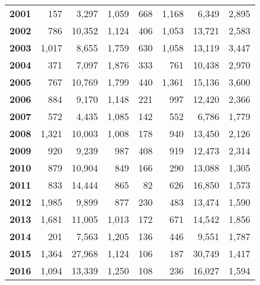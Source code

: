 \begin{table}[h]
{\begin{tabular}{@{}>{\bfseries}r r r r r r r r@{}}
2001 & 157 & 3,297 & 1,059 & 668 & 1,168 & 6,349 & 2,895 \\
2002 & 786 & 10,352 & 1,124 & 406 & 1,053 & 13,721 & 2,583 \\
2003 & 1,017 & 8,655 & 1,759 & 630 & 1,058 & 13,119 & 3,447 \\
2004 & 371 & 7,097 & 1,876 & 333 & 761 & 10,438 & 2,970 \\
2005 & 767 & 10,769 & 1,799 & 440 & 1,361 & 15,136 & 3,600 \\
2006 & 884 & 9,170 & 1,148 & 221 & 997 & 12,420 & 2,366 \\
2007 & 572 & 4,435 & 1,085 & 142 & 552 & 6,786 & 1,779 \\
2008 & 1,321 & 10,003 & 1,008 & 178 & 940 & 13,450 & 2,126 \\
2009 & 920 & 9,239 & 987 & 408 & 919 & 12,473 & 2,314 \\
2010 & 879 & 10,904 & 849 & 166 & 290 & 13,088 & 1,305 \\
2011 & 833 & 14,444 & 865 & 82 & 626 & 16,850 & 1,573 \\
2012 & 1,985 & 9,899 & 877 & 230 & 483 & 13,474 & 1,590 \\
2013 & 1,681 & 11,005 & 1,013 & 172 & 671 & 14,542 & 1,856 \\
2014 & 201 & 7,563 & 1,205 & 136 & 446 & 9,551 & 1,787 \\
2015 & 1,364 & 27,968 & 1,124 & 106 & 187 & 30,749 & 1,417 \\
2016 & 1,094 & 13,339 & 1,250 & 108 & 236 & 16,027 & 1,594 \\
\bottomrule
\end{tabular}
}
\end{table}
